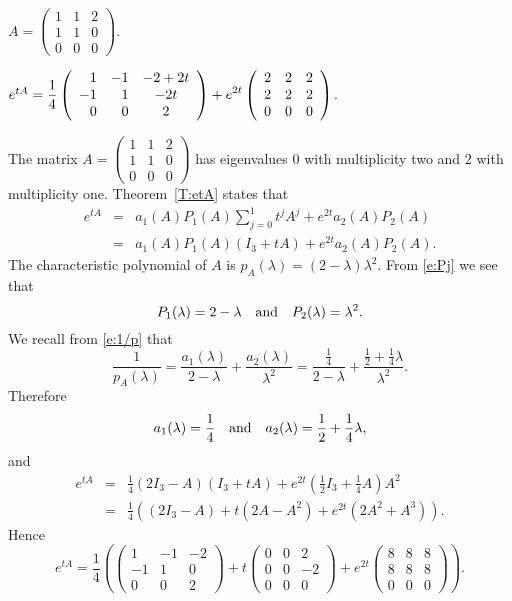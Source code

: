 \documentclass{ximera}
\begin{document}
\begin{exercise} \label{c12.1.8c}
$A = \left(\begin{array}{rrr} 1 & 1 & 2\\ 1 & 1 & 0 \\ 0 & 0 & 0
\end{array}\right)$.

\begin{solution}
\ans $e^{tA}= \displaystyle\frac{1}{4}\left(\begin{array}{rrc} 
1 & -1 & -2+2t\\ -1 & 1 & -2t \\ 0 & 0 & 2\end{array}\right) +e^{2t}\left(\begin{array}{rrr} 2 & 2 & 2\\  2 & 2 & 2 \\ 0 & 0 & 0 
\end{array}\right)$.

\soln The matrix 
$A = \left(\begin{array}{rrr} 1 & 1 & 2\\ 1 & 1 & 0 \\ 0 & 0 & 0
\end{array}\right)$ has eigenvalues $0$ with multiplicity two and $2$ 
with multiplicity one. Theorem~\ref{T:etA} states that 
\begin{eqnarray*}
e^{tA} & = & a_1(A)P_1(A)\sum_{j=0}^1t^jA^j + e^{2t}a_2(A)P_2(A)\\
 & = & a_1(A)P_1(A)(I_3+tA) + e^{2t}a_2(A)P_2(A).
\end{eqnarray*}
The characteristic polynomial of $A$ is $p_A(\lambda) =(2-\lambda)\lambda^2$.
From \eqref{e:Pj} we see that
\[
P_1(\lambda) = 2-\lambda \quad\mbox{and}\quad P_2(\lambda) = \lambda^2.
\]
We recall from \eqref{e:1/p} that 
\[
\frac{1}{p_A(\lambda)} = \frac{a_1(\lambda)}{2-\lambda} + 
\frac{a_2(\lambda)}{\lambda^2} = \frac{\frac{1}{4}}{2-\lambda}
+ \frac{\frac{1}{2}+\frac{1}{4}\lambda}{\lambda^2}.
\]
Therefore
\[
a_1(\lambda) = \frac{1}{4} \quad\mbox{and}\quad a_2(\lambda) = \frac{1}{2}+\frac{1}{4}\lambda,
\]
and
\begin{eqnarray*}
e^{tA} & = & \frac{1}{4}(2I_3-A)(I_3+tA) + 
e^{2t}\left(\frac{1}{2}I_3+\frac{1}{4}A\right)A^2\\
& = & \frac{1}{4}\left((2I_3-A)+t(2A-A^2)+e^{2t}(2A^2+A^3)\right).
\end{eqnarray*}
Hence
\[
e^{tA}= \frac{1}{4}\left(\left(\begin{array}{rrr} 1 & -1 & -2\\ -1 & 1 & 0 
\\ 0 & 0 & 2\end{array}\right)+t\left(\begin{array}{rrr} 0 & 0 & 2\\ 0 & 0 & -2
\\ 0 & 0 & 0 \end{array}\right)+e^{2t}\left(\begin{array}{rrr} 8 & 8 & 8\\ 
8 & 8 & 8 \\ 0 & 0 & 0\end{array}\right)\right).
\]


\end{solution}
\end{exercise}
\end{document}
